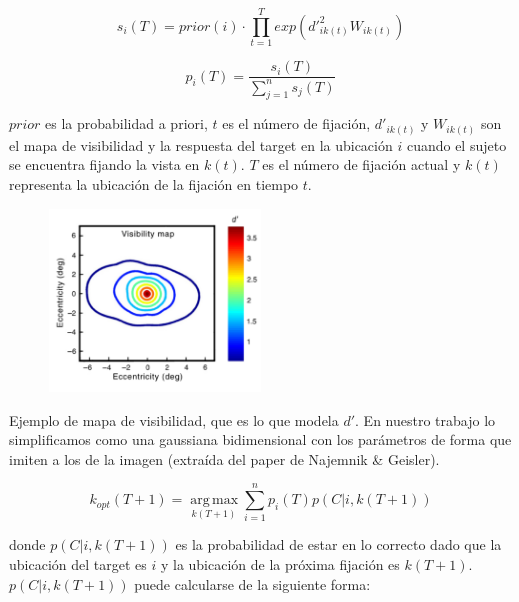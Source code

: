 \documentclass[compress]{beamer}
\DeclareMathOperator*{\argmax}{arg\,max}
\begin{document}
\begin{frame}

$$s_{i}(T) = prior(i) \cdot \prod_{t=1}^T exp\left(d'^2_{ik(t)} W_{ik(t)}\right)$$

$$p_i(T) = \displaystyle\frac{s_i(T)}{\sum_{j=1}^n s_j(T)}$$

\bigskip
$prior$ es la probabilidad a priori, $t$ es el número de fijación, $d'_{ik(t)}$ y $W_{ik(t)}$ son el mapa de visibilidad y la respuesta del target en la ubicación $i$ cuando el sujeto se encuentra fijando la vista en $k(t)$. $T$ es el número de fijación actual y $k(t)$ representa la ubicación de la fijación en tiempo $t$.

\end{frame}

\begin{frame}

\begin{figure}
\begin{center}
\includegraphics[width=0.5\textwidth]{images/visibility-map.png} 
\end{center}
\end{figure}

Ejemplo de mapa de visibilidad, que es lo que modela $d'$. En nuestro trabajo lo simplificamos como una gaussiana bidimensional con los parámetros de forma que imiten a los de la imagen (extraída del paper de Najemnik \& Geisler).%

\end{frame}

\begin{frame}

$$k_{opt}(T+1) = \argmax\limits_{k(T+1)} \sum_{i=1}^n p_i(T)p(C|i,k(T+1))$$

donde $p(C|i,k(T+1))$ es la probabilidad de estar en lo correcto dado que la ubicación del target es $i$ y la ubicación de la próxima fijación es $k(T+1)$. $p(C|i,k(T+1))$ puede calcularse de la siguiente forma:
\end{frame}
\end{document}
